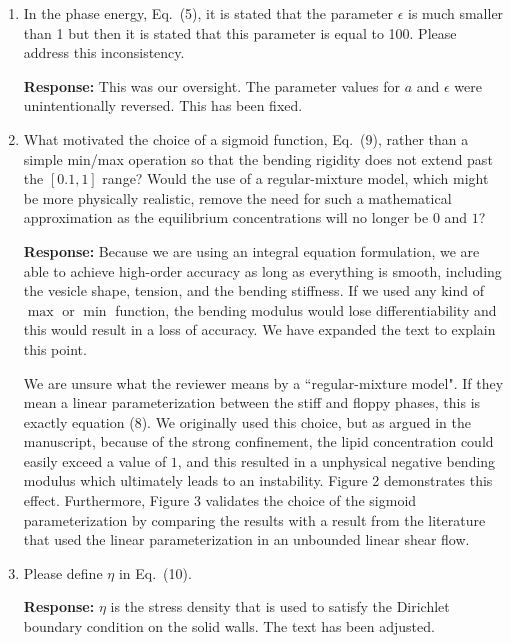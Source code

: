 \documentclass[11pt]{article}
\begin{document}
\begin{enumerate}
\item In the phase energy, Eq.~(5), it is stated that the parameter
  $\epsilon$ is much smaller than 1 but then it is stated that this
    parameter is equal to 100. Please address this inconsistency.

\noindent
{\bf Response:} This was our oversight. The parameter values for $a$ and
$\epsilon$ were unintentionally reversed. This has been fixed.

\item What motivated the choice of a sigmoid function, Eq.~(9), rather
  than a simple min/max operation so that the bending rigidity does not
    extend past the $[0.1, 1]$ range? Would the use of a regular-mixture
    model, which might be more physically realistic, remove the need for
    such a mathematical approximation as the equilibrium concentrations
    will no longer be $0$ and $1$?

\noindent
{\bf Response:} Because we are using an integral equation formulation,
    we are able to achieve high-order accuracy as long as everything is
    smooth, including the vesicle shape, tension, and the bending
    stiffness. If we used any kind of $\max$ or $\min$ function, the
    bending modulus would lose differentiability and this would result
    in a loss of accuracy. We have expanded the text to explain this
    point.

    We are unsure what the reviewer means by a ``regular-mixture model".
    If they mean a linear parameterization between the stiff and floppy
    phases, this is exactly equation (8).  We originally used this
    choice, but as argued in the manuscript, because of the strong
    confinement, the lipid concentration could easily exceed a value of
    $1$, and this resulted in a unphysical negative bending modulus
    which ultimately leads to an instability.  Figure 2 demonstrates
    this effect. Furthermore, Figure 3 validates the choice of the
    sigmoid parameterization by comparing the results with a result from
    the literature that used the linear parameterization in an unbounded
    linear shear flow.

\item Please define $\eta$ in Eq.~(10). 

\noindent
{\bf Response:} $\eta$ is the stress density that is used to satisfy the
    Dirichlet boundary condition on the solid walls. The text has been
    adjusted.


\end{enumerate}
\end{document}
